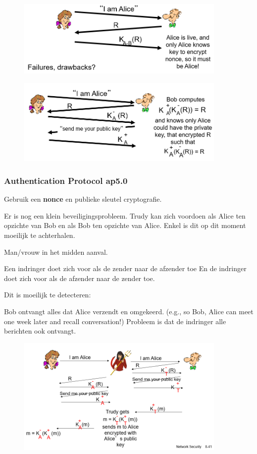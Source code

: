 \begin{figure}[h]
    \centering
    \includegraphics[width=4in]{./img/imghfdst8/hfdst8puntje20.png}
    \caption{ }      
    \label{fig: }
\end{figure}

\begin{figure}[h]
    \centering
    \includegraphics[width=4in]{./img/imghfdst8/hfdst8puntje21.png}
    \caption{ }      
    \label{fig: }
\end{figure}
 

\subsubsection{Authentication Protocol ap5.0}

Gebruik een \textbf{nonce} en publieke sleutel cryptografie.

\noindent Er is nog een klein beveiligingsprobleem. Trudy kan zich voordoen als Alice ten opzichte van Bob en als Bob ten opzichte van Alice. Enkel is dit op dit moment moeilijk te achterhalen.


Man/vrouw in het midden aanval.

\fra Een indringer doet zich voor als de zender naar de afzender toe
\fra En de indringer doet zich voor als de afzender naar de zender toe.

\noindent Dit is moeilijk te detecteren:

\bi
\itf 	Bob ontvangt alles dat Alice verzendt en omgekeerd. (e.g., so Bob, Alice can meet one week later and recall conversation!)
\itf Probleem is dat de indringer alle berichten ook ontvangt.
\ei

\begin{figure}[h]
    \centering
   \includegraphics[width=4in]{./img/imghfdst8/hfdst8puntje22.png}
    \caption{ }      
    \label{fig: }
\end{figure}